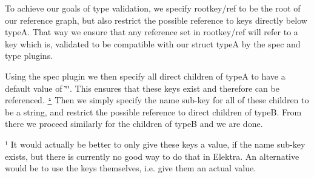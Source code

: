 To achieve our goals of type validation, we specify {\ttfamily rootkey/ref} to be the root of our reference graph, but also restrict the possible reference to keys directly below {\ttfamily typeA}. That way we ensure that any reference set in {\ttfamily rootkey/ref} will refer to a key which is, validated to be compatible with our {\ttfamily struct typeA} by the spec and type plugins.

Using the spec plugin we then specify all direct children of {\ttfamily typeA} to have a default value of {\ttfamily \char`\"{}\char`\"{}}. This ensures that these keys exist and therefore can be referenced. \href{#note-empty-val}{\tt ¹} Then we simply specify the {\ttfamily name} sub-\/key for all of these children to be a string, and restrict the possible reference to direct children of {\ttfamily typeB}. From there we proceed similarly for the children of {\ttfamily typeB} and we are done. 



¹ It would actually be better to only give these keys a value, if the {\ttfamily name} sub-\/key exists, but there is currently no good way to do that in Elektra. An alternative would be to use the keys themselves, i.\+e. give them an actual value. 